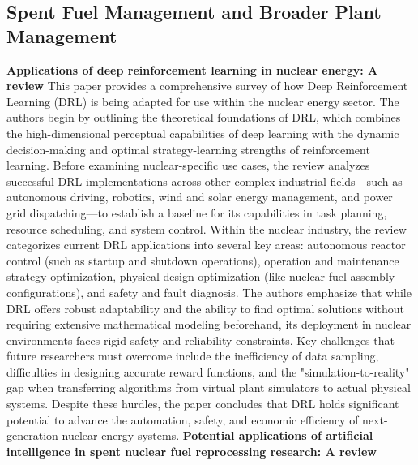 \documentclass{article}
\begin{document}
\subsection{Spent Fuel Management and Broader Plant Management}
\textbf{Applications of deep reinforcement learning in nuclear energy: A review}
\newline
This paper provides a comprehensive survey of how Deep Reinforcement Learning (DRL) is being adapted for use within the nuclear energy sector. The authors begin by outlining the theoretical foundations of DRL, which combines the high-dimensional perceptual capabilities of deep learning with the dynamic decision-making and optimal strategy-learning strengths of reinforcement learning. Before examining nuclear-specific use cases, the review analyzes successful DRL implementations across other complex industrial fields—such as autonomous driving, robotics, wind and solar energy management, and power grid dispatching—to establish a baseline for its capabilities in task planning, resource scheduling, and system control.
\newline
Within the nuclear industry, the review categorizes current DRL applications into several key areas: autonomous reactor control (such as startup and shutdown operations), operation and maintenance strategy optimization, physical design optimization (like nuclear fuel assembly configurations), and safety and fault diagnosis. The authors emphasize that while DRL offers robust adaptability and the ability to find optimal solutions without requiring extensive mathematical modeling beforehand, its deployment in nuclear environments faces rigid safety and reliability constraints. Key challenges that future researchers must overcome include the inefficiency of data sampling, difficulties in designing accurate reward functions, and the "simulation-to-reality" gap when transferring algorithms from virtual plant simulators to actual physical systems. Despite these hurdles, the paper concludes that DRL holds significant potential to advance the automation, safety, and economic efficiency of next-generation nuclear energy systems.
\newline
\textbf{Potential applications of artificial intelligence in spent nuclear fuel reprocessing research: A review}
\newline
\end{document}
